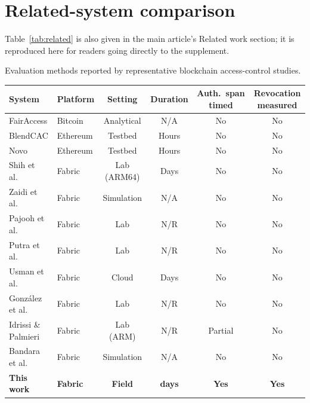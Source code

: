 \section{Related-system comparison}
\label{sec:supp_related}

Table~\ref{tab:related} is also given in the main article's Related work
section; it is reproduced here for readers going directly to the
supplement.

\begin{widetab}
\caption{Evaluation methods reported by representative blockchain access-control studies.}
\label{tab:related}
\small
\begin{tabularx}{\tblwidth}{@{}l l c c c C@{}}
\toprule
System & Platform & Setting & Duration & Auth.\ span timed & Revocation measured \\
\midrule
FairAccess \cite{ouaddah2016fairaccess}   & Bitcoin  & Analytical & N/A   & No & No \\
BlendCAC \cite{xu2018blendcac}            & Ethereum & Testbed    & Hours & No & No \\
Novo \cite{novo2018blockchain}            & Ethereum & Testbed    & Hours & No & No \\
Shih et al.\ \cite{shih2022iiot}          & Fabric   & Lab (ARM64)& Days  & No & No \\
Zaidi et al.\ \cite{zaidi2023fabrication} & Fabric   & Simulation & N/A   & No & No \\
Pajooh et al.\ \cite{pajooh2022fabric_iot}& Fabric   & Lab        & N/R   & No & No \\
Putra et al.\ \cite{putra2021trust}       & Fabric   & Lab        & N/R   & No & No \\
Usman et al.\ \cite{usman2024blockchain}  & Fabric   & Cloud      & Days  & No & No \\
Gonz\'{a}lez et al.\ \cite{gonzalez2023marketplace} & Fabric & Lab & N/R & No & No \\
Idrissi \& Palmieri \cite{idrissi2024blockchain_jsupercomput}
                                          & Fabric   & Lab (ARM)  & N/R   & Partial & No \\
Bandara et al.\ \cite{bandara2021modeling}& Fabric   & Simulation & N/A   & No & No \\
\textbf{This work}                        & \textbf{Fabric} &
  \textbf{Field} & \textbf{\DeployDays{} days} & \textbf{Yes} & \textbf{Yes} \\
\bottomrule
\end{tabularx}
\end{widetab}

